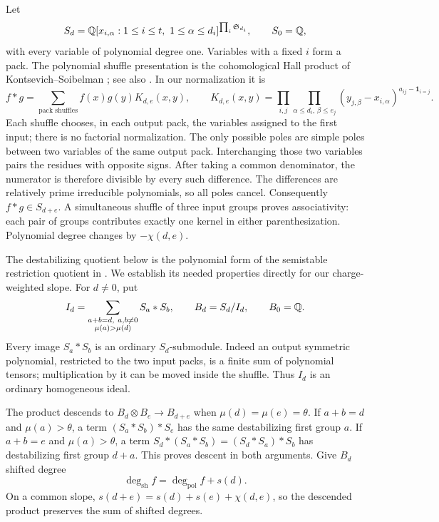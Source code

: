 Let
\[
 S_d=\Q[x_{i,\alpha}:1\le i\le t,\ 1\le\alpha\le d_i]
       ^{\prod_i\mathfrak S_{d_i}},\qquad S_0=\Q,
\]
with every variable of polynomial degree one.  Variables with a fixed
$i$ form a pack.  The polynomial shuffle presentation is the cohomological Hall product
of Kontsevich--Soibelman \cite[Section~2.4, Theorem~2]{KS11}; see also
\cite[Theorem~2.2]{Ef12}.  In our normalization it is
\begin{equation}\label{alg:shuffle}
 f*g=\sum_{\text{pack shuffles}}f(x)g(y)K_{d,e}(x,y),\qquad
 K_{d,e}(x,y)=
 \prod_{i,j}\prod_{\alpha\le d_i,\,\beta\le e_j}
 (y_{j,\beta}-x_{i,\alpha})^{a_{ij}-\boldsymbol1_{i=j}}.
\end{equation}
Each shuffle chooses, in each output pack, the variables assigned to
the first input; there is no factorial normalization.  The only
possible poles are simple poles between two variables of the same
output pack.  Interchanging those two variables pairs the residues
with opposite signs.  After taking a common denominator, the
numerator is therefore divisible by every such difference.  The
differences are relatively prime irreducible polynomials, so all poles
cancel.  Consequently $f*g\in S_{d+e}$.  A simultaneous shuffle of
three input groups proves associativity: each pair of groups
contributes exactly one kernel in either parenthesization.  Polynomial
degree changes by $-\chi(d,e)$.

The destabilizing quotient below is the polynomial form of the
semistable restriction quotient in \cite[Theorem~8.1]{FR18}.  We
establish its needed properties directly for our charge-weighted slope.
For $d\ne0$, put
\begin{equation}\label{alg:quotient}
 I_d=\sum_{\substack{a+b=d,\ a,b\ne0\\\mu(a)>\mu(d)}}S_a*S_b,
 \qquad B_d=S_d/I_d,
 \qquad B_0=\mathbb Q.
\end{equation}
Every image $S_a*S_b$ is an ordinary $S_d$-submodule.  Indeed an
output symmetric polynomial, restricted to the two input packs, is a
finite sum of polynomial tensors; multiplication by it can be moved
inside the shuffle.  Thus $I_d$ is an ordinary homogeneous ideal.

The product descends to $B_d\otimes B_e\to B_{d+e}$ when
$\mu(d)=\mu(e)=\theta$.  If $a+b=d$ and $\mu(a)>\theta$, a term
$(S_a*S_b)*S_e$ has the same destabilizing first group $a$.  If
$a+b=e$ and $\mu(a)>\theta$, a term
$S_d*(S_a*S_b)=(S_d*S_a)*S_b$ has destabilizing first group $d+a$.
This proves descent in both arguments.  Give $B_d$ shifted degree
\begin{equation}\label{alg:shifted-degree}
 \deg_{\mathrm{sh}}f=\deg_{\mathrm{pol}}f+s(d).
\end{equation}
On a common slope,
$s(d+e)=s(d)+s(e)+\chi(d,e)$, so the descended product preserves the
sum of shifted degrees.

